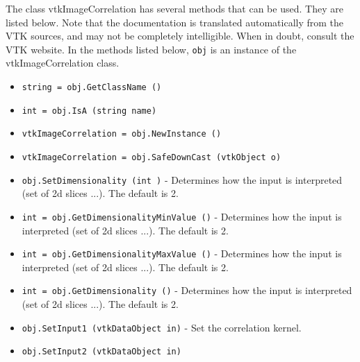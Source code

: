The class vtkImageCorrelation has several methods that can be used.
  They are listed below.
Note that the documentation is translated automatically from the VTK sources,
and may not be completely intelligible.  When in doubt, consult the VTK website.
In the methods listed below, \verb|obj| is an instance of the vtkImageCorrelation class.
\begin{itemize}
\item  \verb|string = obj.GetClassName ()|

\item  \verb|int = obj.IsA (string name)|

\item  \verb|vtkImageCorrelation = obj.NewInstance ()|

\item  \verb|vtkImageCorrelation = obj.SafeDownCast (vtkObject o)|

\item  \verb|obj.SetDimensionality (int )| -  Determines how the input is interpreted (set of 2d slices ...).
 The default is 2.

\item  \verb|int = obj.GetDimensionalityMinValue ()| -  Determines how the input is interpreted (set of 2d slices ...).
 The default is 2.

\item  \verb|int = obj.GetDimensionalityMaxValue ()| -  Determines how the input is interpreted (set of 2d slices ...).
 The default is 2.

\item  \verb|int = obj.GetDimensionality ()| -  Determines how the input is interpreted (set of 2d slices ...).
 The default is 2.

\item  \verb|obj.SetInput1 (vtkDataObject in)| -  Set the correlation kernel.

\item  \verb|obj.SetInput2 (vtkDataObject in)|

\end{itemize}
